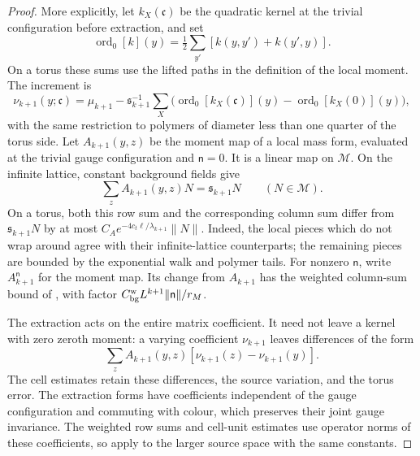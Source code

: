 \documentclass[11pt,letterpaper,reqno]{amsart}
\theoremstyle{definition}
\theoremstyle{remark}
\begin{document}
\begin{proof}
More explicitly, let $k_X(\mathfrak c)$ be the quadratic
kernel at the trivial configuration before extraction,
and set
\[
 \operatorname{ord}_0[k](y)
   =\tfrac12\sum_{y'}[k(y,y')+k(y',y)].
\]
On a torus these sums use the lifted paths in the
definition of the local moment. The increment is
\[
 \nu_{k+1}(y;\mathfrak c)=\mu_{k+1}
 -\mathfrak s_{k+1}^{-1}\sum_X
  \bigl(\operatorname{ord}_0[k_X(\mathfrak c)](y)
             -\operatorname{ord}_0[k_X(0)](y)\bigr),
\]
with the same restriction to polymers of diameter less
than one quarter of the torus side. Let $A_{k+1}(y,z)$
be the moment map of a local mass form, evaluated at
the trivial gauge configuration and $\mathsf n=0$.
It is a linear map on $\mathcal M$. On the infinite
lattice, constant background fields give
\begin{equation}\label{eq:qcdm2-current-matrix-extraction}
 \sum_zA_{k+1}(y,z)N=\mathfrak s_{k+1}N
                  \qquad(N\in\mathcal M).
\end{equation}
On a torus, both this row sum and the corresponding
column sum differ from $\mathfrak s_{k+1}N$ by at most
$C_Ae^{-4c_t\ell/\lambda_{k+1}}\|N\|$. Indeed, the local
pieces which do not wrap around agree with their
infinite-lattice counterparts; the remaining pieces
are bounded by the exponential walk and polymer tails.
For nonzero $\mathsf n$, write $A_{k+1}^{\mathsf n}$
for the moment map. Its change from $A_{k+1}$ has the
weighted column-sum bound of
\cite[Prop. 10.1, proof]{QCDM1}, with factor
$C_{\rm bg}^{\rm w}L^{k+1}\|\mathsf n\|/r_M$.

The extraction acts on the entire matrix coefficient.
It need not leave a kernel with zero zeroth moment:
a varying coefficient $\nu_{k+1}$ leaves differences
of the form
\[
 \sum_z A_{k+1}(y,z)
           [\nu_{k+1}(z)-\nu_{k+1}(y)].
\]
The cell estimates retain these differences, the
source variation, and the torus error. The extraction
forms have coefficients independent of
the gauge configuration and commuting with colour,
which preserves their joint gauge invariance.
The weighted row sums and cell-unit estimates use
operator norms of these coefficients, so apply to
the larger source space with the same constants.


\end{proof}
\end{document}
